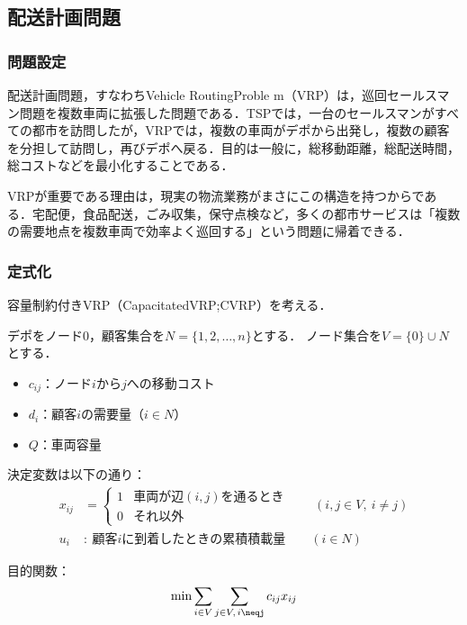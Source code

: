 \subsection{配送計画問題}

\subsubsection{問題設定}

配送計画問題，すなわちVehicle RoutingProble m（VRP）は，巡回セールスマン問題を複数車両に拡張した問題である\cite{LAPORTE1992345}．TSPでは，一台のセールスマンがすべての都市を訪問したが，VRPでは，複数の車両がデポから出発し，複数の顧客を分担して訪問し，再びデポへ戻る．目的は一般に，総移動距離，総配送時間，総コストなどを最小化することである．

VRPが重要である理由は，現実の物流業務がまさにこの構造を持つからである．宅配便，食品配送，ごみ収集，保守点検など，多くの都市サービスは「複数の需要地点を複数車両で効率よく巡回する」という問題に帰着できる．

\subsubsection{定式化}

容量制約付きVRP（CapacitatedVRP;CVRP）を考える．

デポをノード$0$，顧客集合を$N=\{1,2,\dots,n\}$とする．
ノード集合を$V=\{0\}\cup N$とする．

\begin{itemize}
\item $c_{ij}$：ノード$i$から$j$への移動コスト
\item $d_i$：顧客$i$の需要量（$i\in N$）
\item $Q$：車両容量
\end{itemize}

決定変数は以下の通り：
\begin{align}
x_{ij} &=
\begin{cases}
1 & \text{車両が辺$(i,j)$を通るとき} \\
0 & \text{それ以外}
\end{cases}
\qquad (i,j \in  V,\ i \neq j) \\
u_i &:\ \text{顧客$i$に到着したときの累積積載量}
\qquad (i \in  N)
\end{align}

目的関数：
\begin{equation}
\min \sum_{i\in V}\sum_{j\in V,\,i\neqj}c_{ij}x_{ij}
\end{equation}

